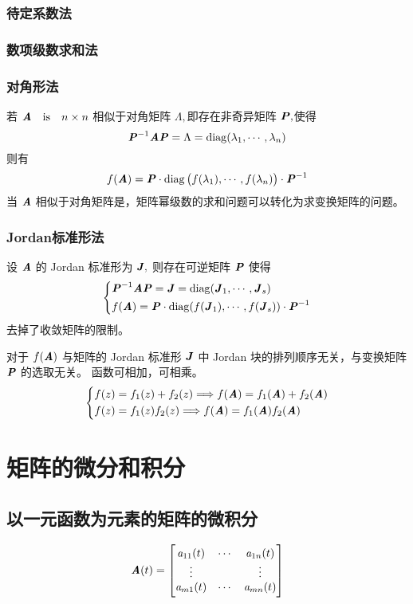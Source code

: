 \subsubsection{待定系数法} \label{ssub:待定系数法} \subsubsection{数项级数求和法} \label{ssub:数项级数求和法} \subsubsection{对角形法} \label{ssub:对角形法} 若 $\ann$ 相似于对角矩阵 $\Lambda,$即存在非奇异矩阵 $\MP,$使得 \[ \MP^{-1} \MA \MP = \Lambda = \mathrm{diag}(\lambda_1, \cdots, \lambda_n) \] 则有 \[ f(\MA) = \MP \cdot \mathrm{diag}\left(f(\lambda_1), \cdots, f(\lambda_n)\right) \cdot \MP^{-1} \] 当 $\MA$ 相似于对角矩阵是，矩阵幂级数的求和问题可以转化为求变换矩阵的问题。 \subsubsection{Jordan标准形法} \label{ssub:Jordan标准形法} \begin{definition} 设 $\MA$ 的 Jordan 标准形为 $\MJ,$ 则存在可逆矩阵 $\MP$ 使得 \[ \begin{dcases} \MP^{-1} \MA \MP = \MJ = \mathrm{diag}(\MJ_1, \cdots, \MJ_s) \\ f(\MA) = \MP \cdot \mathrm{diag}(f(\MJ_1), \cdots, f(\MJ_s)) \cdot \MP^{-1} \end{dcases} \] 去掉了收敛矩阵的限制。 \end{definition} \begin{theorem} 对于 $f(\MA)$ 与矩阵的 Jordan 标准形 $\MJ$ 中 Jordan 块的排列顺序无关，与变换矩阵 $\MP$ 的选取无关。 函数可相加，可相乘。 \[ \begin{dcases} f(z) = f_1(z) +f_2(z) \Longrightarrow f(\MA) = f_1(\MA) + f_2(\MA) \\ f(z) = f_1(z) f_2(z) \Longrightarrow f(\MA) = f_1(\MA)  f_2(\MA) \end{dcases} \] \end{theorem} 
\section{矩阵的微分和积分}
\label{sec:矩阵的微分和积分}

\subsection{以一元函数为元素的矩阵的微积分}
\label{sub:以一元函数为元素的矩阵的微积分}
\[ \MA(t) = \begin{bmatrix} \Sa_{11}(t) & \cdots    & \Sa_{1n}(t)   \\ \vdots      &           & \vdots        \\ \Sa_{m1}(t) & \cdots    & \Sa_{mn}(t) \end{bmatrix} \] 
